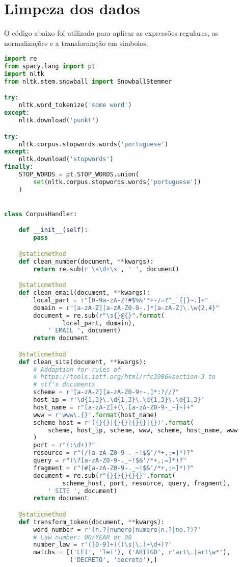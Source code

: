 \chapter{Limpeza dos dados}
\label{sec:apendiceB}

O código abaixo foi utilizado para aplicar as expressões regulares, as normalizações e a transformação em símbolos.

\begin{lstlisting}[language=Python,extendedchars=true]
import re
from spacy.lang import pt
import nltk
from nltk.stem.snowball import SnowballStemmer

try:
    nltk.word_tokenize('some word')
except:
    nltk.download('punkt')

try:
    nltk.corpus.stopwords.words('portuguese')
except:
    nltk.download('stopwords')
finally:
    STOP_WORDS = pt.STOP_WORDS.union(
        set(nltk.corpus.stopwords.words('portuguese'))
    )


class CorpusHandler:

    def __init__(self):
        pass

    @staticmethod
    def clean_number(document, **kwargs):
        return re.sub(r'\s\d+\s', ' ', document)

    @staticmethod
    def clean_email(document, **kwargs):
        local_part = r"[0-9a-zA-Z!#$%&'*+-/=?^_`{|}~.]+"
        domain = r"[a-zA-Z][a-zA-Z0-9-.]*[a-zA-Z]\.\w{2,4}"
        document = re.sub(r"\s{}@{}".format(
                local_part, domain),
            ' EMAIL ', document)
        return document

    @staticmethod
    def clean_site(document, **kwargs):
        # Addaption for rules of
        # https://tools.ietf.org/html/rfc3986#section-3 to
        # stf's documents
        scheme = r"[a-zA-Z][a-zA-Z0-9+-.]*:?//?"
        host_ip = r'\d{1,3}\.\d{1,3}\.\d{1,3}\.\d{1,3}'
        host_name = r"[a-zA-Z]+(\.[a-zA-Z0-9-_~]+)+"
        www = r'www\.{}'.format(host_name)
        scheme_host = r'({}{}|{}{}|{}{}|{})'.format(
            scheme, host_ip, scheme, www, scheme, host_name, www
        )
        port = r"(:\d+)?"
        resource = r"(/[a-zA-Z0-9-._~!$&'/*+,;=]*)?"
        query = r"(\?[a-zA-Z0-9-._~!$&'/*+,;=]*)?"
        fragment = r"(#[a-zA-Z0-9-._~!$&'/*+,;=]*)?"
        document = re.sub(r"{}{}{}{}{}".format(
                scheme_host, port, resource, query, fragment),
            ' SITE ', document)
        return document

    @staticmethod
    def transform_token(document, **kwargs):
        word_number = r'(n.?|numero|numero|n.?|no.?)?'
        # Law number: 00/YEAR or 00
        number_law = r'([0-9]+)((\s|\.)+\d+)?'
        matchs = [('LEI', 'lei'), ('ARTIGO', r'art\.|art\w*'),
                  ('DECRETO', 'decreto'),]


\end{lstlisting}
